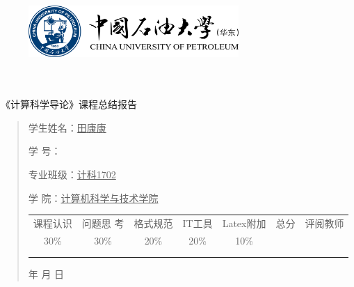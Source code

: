 \documentclass{article}
\renewcommand{\today}{\number\year 年 \number\month 月 \number\day 日}
\begin{document}
\begin{figure}
    \centering
    \includegraphics[width=8cm]{upc.png}

    \label{figupc}
\end{figure}

	\begin{center}
		\quad \\
		\quad \\
		\heiti \fontsize{45}{17} \quad \quad \quad 
		\vskip 1.5cm
		\heiti {} 《计算科学导论》课程总结报告
	\end{center}
	\vskip 2.0cm
		
	\begin{quotation}
		\doublespacing
		
        \par\setlength\parindent{7em}
		\quad 

		学生姓名：\underline{\qquad  田康康 \qquad \qquad}

		学\hspace{0.61cm} 号：\underline{\qquad}
		
		专业班级：\underline{\qquad 计科1702 \qquad  }
		
        学\hspace{0.61cm} 院：\underline{计算机科学与技术学院}
		\vskip 2cm
		\centering
		\begin{table}[h]
            \centering 
            \begin{tabular}{|c|c|c|c|c|c|c|}
                \hline
                课程认识 & 问题思 考 & 格式规范  & IT工具  & Latex附加  & 总分 & 评阅教师 \\
                30\% & 30\% & 20\% & 20\% & 10\% &  &  \\
                \hline
                 & & & & & &\\
                & & & & & &\\
                \hline
            \end{tabular}
        \end{table}
		\vskip 2cm
		\today
	\end{quotation}
\end{document}
